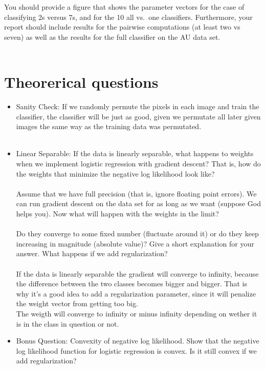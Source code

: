 \documentclass[paper=a4, fontsize=11pt]{scrartcl} %
\numberwithin{equation}{section} %
\numberwithin{figure}{section} %
\numberwithin{table}{section} %
\begin{document}
	You should provide a figure that shows the parameter vectors for the case of classifying 2s versus 7s, and for the 10 all vs.~one classifiers. Furthermore, your report should include results for the pairwise computations (at least two vs seven) as well as the results for the full classifier on the AU data set. \\ \\
	\section*{Theorerical questions}
	\begin{itemize}
		\item Sanity Check: If we randomly permute the pixels in each image and train the classifier, the classifier will be just as good, given we permutate all later given images the same way as the training data was permutated. 
		\\ \\
		\item Linear Separable: If the data is linearly separable, what happens to weights when we implement logistic regression with gradient descent? That is, how do the weights that minimize the negative log likelihood look like? \\ \\
		Assume that we have full precision (that is, ignore floating point errors). We can run gradient descent on the data set for as long as we want (suppose God helps you). Now what will happen with the weights in the limit? \\ \\
		Do they converge to some fixed number (fluctuate around it) or do they keep increasing in magnitude (absolute value)? Give a short explanation for your answer. What happens if we add regularization? \\ \\
		
		If the data is linearly separable the gradient will converge to infinity, because the difference between the two classes becomes bigger and bigger. That is why it's a good idea to add a regularization parameter, since it will penalize the weight vector from getting too big. 
		\\
		The weigth will converge to infinity or minus infinity depending on wether it is in the class in question or not.
		\\
		
		\item Bonus Question: Convexity of negative log likelihood. Show that the negative log likelihood function for logistic regression is convex. Is it still convex if we add regularization?
	\end{itemize}
	
	
	
\end{document}

